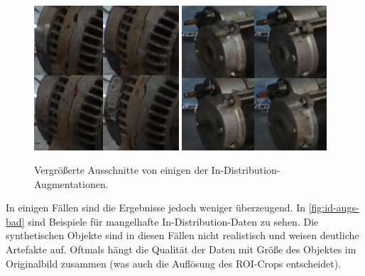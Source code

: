 \begin{figure}
	\centering
	\includegraphics[width=0.48\textwidth]{figure_results_id-augs_good_1.png}%
	\hspace{0.02\textwidth}\includegraphics[width=0.48\textwidth]{figure_results_id-augs_good_2.png}%
	\caption{Vergrößerte Ausschnitte von einigen der In-Distribution-Augmentationen.}
	\label{fig:id-augs-good}
\end{figure}

In einigen Fällen sind die Ergebnisse jedoch weniger überzeugend. In \autoref{fig:id-augs-bad} sind Beispiele für mangelhafte In-Distribution-Daten zu sehen. Die synthetischen Objekte sind in diesen Fällen nicht realistisch und weisen deutliche Artefakte auf. Oftmals hängt die Qualität der Daten mit Größe des Objektes im Originalbild zusammen (was auch die Auflösung des ROI-Crops entscheidet). %

